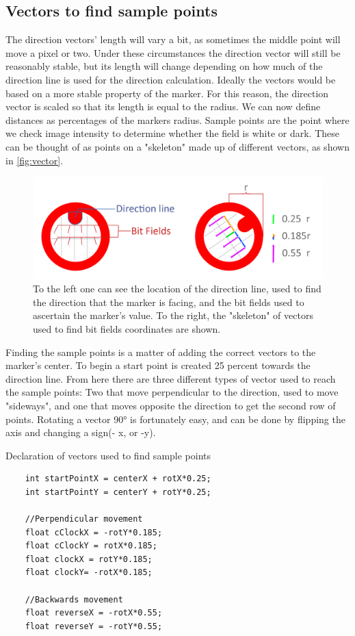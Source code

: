 \subsection{Vectors to find sample points}
The direction vectors' length will vary a bit, as sometimes the middle point will move a pixel or two. Under these circumstances the direction vector will still be reasonably stable, but its length will change depending on how much of the direction line is used for the direction calculation. Ideally the vectors would be based on a more stable property of the marker. For this reason, the direction vector is scaled so that its length is equal to the radius. We can now define distances as percentages of the markers radius. Sample points are the point where we check image intensity to determine whether the field is white or dark. These can be thought of as points on a "skeleton" made up of different vectors, as shown in \autoref{fig:vector}.
\begin{figure}[H]
	\centering
	\includegraphics[width=1\linewidth]{figure/Analysis/vector.png}
	\caption{To the left one can see the location of the direction line, used to find the direction that the marker is facing, and the bit fields used to ascertain the marker's value. To the right, the "skeleton" of vectors used to find bit fields coordinates are shown.} 
	\label{fig:vector}
\end{figure}
Finding the sample points is a matter of adding the correct vectors to the marker's center. To begin a start point is created 25 percent towards the direction line. From here there are three different types of vector used to reach the sample points: Two that move perpendicular to the direction, used to move "sideways", and one that moves opposite the direction to get the second row of points. Rotating a vector 90° is fortunately easy, and can be done by flipping the axis and changing a sign(- x, or -y).    
\begin{listing}[H]
	\caption{Declaration of vectors used to find sample points}
	\begin{verbatim}
	int startPointX = centerX + rotX*0.25;
	int startPointY = centerY + rotY*0.25;
	
	//Perpendicular movement
	float cClockX = -rotY*0.185;
	float cClockY = rotX*0.185;
	float clockX = rotY*0.185;
	float clockY= -rotX*0.185;
	
	//Backwards movement
	float reverseX = -rotX*0.55;
	float reverseY = -rotY*0.55;
	\end{verbatim}
	\label{listing:vectors}
\end{listing}
